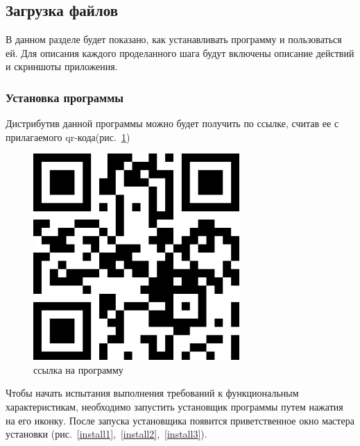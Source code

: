 \subsection{Загрузка файлов}
В данном разделе будет показано, как устанавливать программу и пользоваться ей. Для описания каждого проделанного шага будут включены описание действий и скриншоты приложения.
\subsubsection{Установка программы}
Дистрибутив данной программы можно будет получить по ссылке, считав ее с
прилагаемого qr-кода(рис.~\ref{ref})

\begin{figure}[h!]
    \centering
    \includegraphics[width=0.7\textwidth]{./screenshots/3/qr.png}
    \caption{ссылка на программу}
    \label{ref}
\end{figure}

Чтобы начать испытания выполнения требований к функциональным характеристикам,
необходимо запустить установщик программы путем нажатия на его иконку. После
запуска установщика появится приветственное окно мастера установки (рис.~\ref{install1},~\ref{install2},~\ref{install3}).


